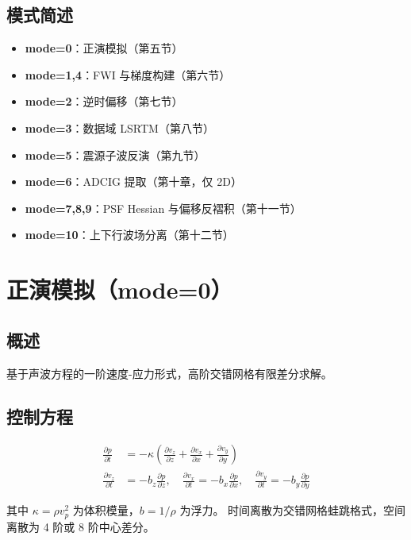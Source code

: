 \documentclass[11pt,a4paper]{ctexart}
\begin{document}
\subsection*{模式简述}

\begin{itemize}
  \item \textbf{mode=0}：正演模拟（第五节）
  \item \textbf{mode=1,4}：FWI 与梯度构建（第六节）
  \item \textbf{mode=2}：逆时偏移（第七节）
  \item \textbf{mode=3}：数据域 LSRTM（第八节）
  \item \textbf{mode=5}：震源子波反演（第九节）
  \item \textbf{mode=6}：ADCIG 提取（第十章，仅 2D）
  \item \textbf{mode=7,8,9}：PSF Hessian 与偏移反褶积（第十一节）
  \item \textbf{mode=10}：上下行波场分离（第十二节）
\end{itemize}

\section{正演模拟（mode=0）}

\subsection{概述}

基于声波方程的一阶速度-应力形式，高阶交错网格有限差分求解。

\subsection{控制方程}

\begin{align*}
  \frac{\partial p}{\partial t} &= -\kappa \left( \frac{\partial v_z}{\partial z} + \frac{\partial v_x}{\partial x} + \frac{\partial v_y}{\partial y} \right) \\
  \frac{\partial v_z}{\partial t} &= -b_z \frac{\partial p}{\partial z},\quad
  \frac{\partial v_x}{\partial t} = -b_x \frac{\partial p}{\partial x},\quad
  \frac{\partial v_y}{\partial t} = -b_y \frac{\partial p}{\partial y}
\end{align*}

其中 $\kappa = \rho v_p^2$ 为体积模量，$b = 1/\rho$ 为浮力。
时间离散为交错网格蛙跳格式，空间离散为 4 阶或 8 阶中心差分。
\end{document}

